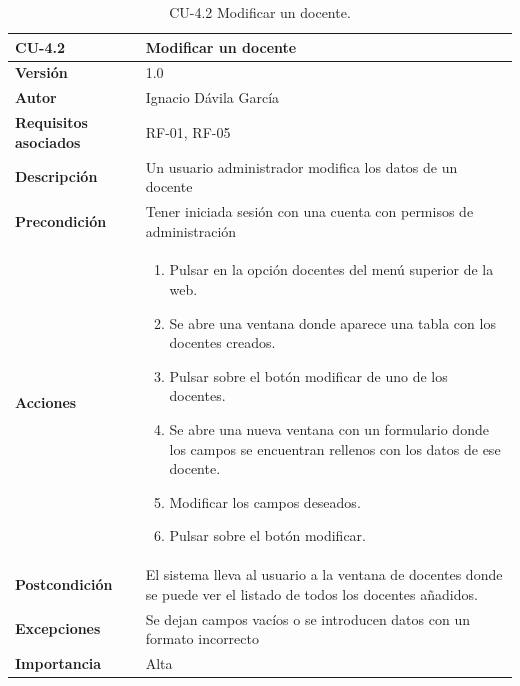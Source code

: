 \begin{table}[p]
	\centering
	\begin{tabularx}{\linewidth}{ p{} p{} }
		\toprule
		\textbf{CU-4.2}    & \textbf{Modificar un docente}\\
		\toprule
		\textbf{Versión}              & 1.0    \\
		\textbf{Autor}                & Ignacio Dávila García \\
		\textbf{Requisitos asociados} & RF-01, RF-05 \\
		\textbf{Descripción}          & Un usuario administrador modifica los datos de un docente \\
		\textbf{Precondición}         & Tener iniciada sesión con una cuenta con permisos de administración \\
		\textbf{Acciones}             &
		\begin{enumerate}
			\def\labelenumi{\arabic{enumi}.}
			\tightlist
			\item Pulsar en la opción docentes del menú superior de la web.
			\item Se abre una ventana donde aparece una tabla con los docentes creados.
			\item Pulsar sobre el botón modificar de uno de los docentes.
			\item Se abre una nueva ventana con un formulario donde los campos se encuentran rellenos con los datos de ese docente.
			\item Modificar los campos deseados.
			\item Pulsar sobre el botón modificar.
		\end{enumerate}\\
		\textbf{Postcondición}        & El sistema lleva al usuario a la ventana de docentes donde se puede ver el listado de todos los docentes añadidos. \\
		\textbf{Excepciones}          & Se dejan campos vacíos o se introducen datos con un formato incorrecto \\
		\textbf{Importancia}          & Alta \\
		\bottomrule
	\end{tabularx}
	\caption{CU-4.2 Modificar un docente.}
\end{table}


